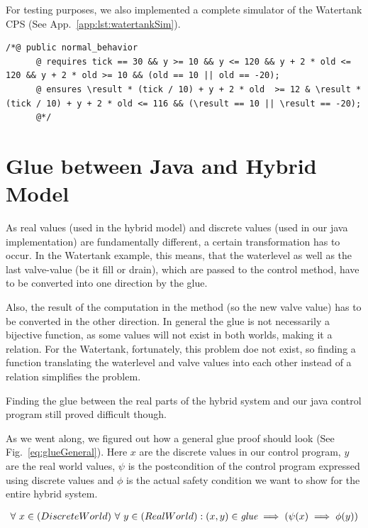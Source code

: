For testing purposes, we also implemented a complete simulator of the Watertank CPS (See App.~\ref{app:lst:watertankSim}).

\begin{lstlisting}[label=lst:JDL]
	/*@ public normal_behavior 
	  @ requires tick == 30 && y >= 10 && y <= 120 && y + 2 * old <= 120 && y + 2 * old >= 10 && (old == 10 || old == -20);
	  @ ensures \result * (tick / 10) + y + 2 * old  >= 12 & \result * (tick / 10) + y + 2 * old <= 116 && (\result == 10 || \result == -20); 
	  @*/
\end{lstlisting} 

\section{Glue between Java and Hybrid Model}
\label{sec:Watertank:Glue}

As real values (used in the hybrid model) and discrete values (used in our java implementation) are fundamentally different, a certain transformation has to occur.  In the Watertank example, this means, that the waterlevel as well as the last valve-value (be it fill or drain), which are passed to the control method, have to be converted into one direction by the glue. 

Also, the result of the computation in the method (so the new valve value) has to be converted in the other direction. In general the glue is not necessarily a bijective function, as some values will not exist in both worlds, making it a relation. For the Watertank, fortunately, this problem doe not exist, so finding a function translating the waterlevel and valve values into each other instead of a relation simplifies the problem.

Finding the glue between the real parts of the hybrid system and our java control program still proved difficult though.

As we went along, we figured out how a general glue proof should look (See Fig.~\ref{eq:glueGeneral}). Here \(x\) are the discrete values in our control program, \(y\) are the real world values, \(\psi\) is the postcondition of the control program expressed using discrete values and \(\phi\) is the actual safety condition we want to show for the entire hybrid system.

\begin{equation}
	\centering
	\begin{split}
		\forall~x \in (Discrete World)~\forall~y \in (Real World):(x,y) \in \textit{glue} \implies (\psi(x) \implies \phi(y))
	\end{split}
	\label{eq:glueGeneral}
\end{equation}

